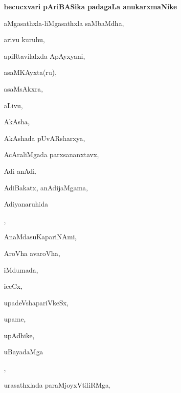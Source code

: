 \noindent
\vskip 1cm

\noindent
\begin{center}
{\Large\bfseries hecucxvari pAriBASika padagaLa anukarxmaNike}
\end{center}
\medskip

\noindent
\begin{multicols}{3}
{\small

\noindent
{aMgasathxla-liMgasathxla saMbaMdha}, \pageref{aMgasathxla-liMgasathxla saMbaMdha}

\noindent
{arivu kuruhu}, \pageref{arivu kuruhu}

\noindent
{apiRtavilalxda ApAyxyani}, \pageref{apiRtavilalxda ApAyxyani}

\noindent
{asaMKAyxta(ru)}, \pageref{asaMKAyxta(ru)}

\noindent
{asaMsAkxra}, \pageref{asaMsAkxra}

\noindent
{aLivu}, \pageref{aLivu}

\noindent
{AkAsha}, \pageref{AkAsha}

\noindent
{AkAshada pUvARsharxya}, \pageref{AkAshada pUvARsharxya}

\noindent
{AcAraliMgada parxsananxtavx}, \pageref{AcAraliMgada parxsananxtavx}

\noindent
{Adi anAdi}, \pageref{Adi anAdi}

\noindent
{AdiBakatx, anAdijaMgama}, \pageref{AdiBakatx, anAdijaMgama}

\noindent
{Adiyanaruhida} 

\noindent
{}, \pageref{Adiyanaruhida anAdiya toVridanu}

\noindent
{AnaMdasuKapariNAmi}, \pageref{AnaMdasuKapariNAmi}

\noindent
{AroVha avaroVha}, \pageref{AroVha avaroVha}

\noindent
{iMdumada}, \pageref{iMdumada}

\noindent
{iceCx}, \pageref{iceCx}

\noindent
{upadeVshapariVkeSx}, \pageref{upadeVshapariVkeSx}

\noindent
{upame}, \pageref{upame}

\noindent
{upAdhike}, \pageref{upAdhike}

\noindent
{uBayadaMga}

\noindent
{}, \pageref{uBayadaMga EkiVkaravAguvudu}

\noindent
{urasathxlada paraMjoyxVtiliRMga}, \pageref{urasathxlada paraMjoyxVtiliRMga}

}
\end{multicols}
